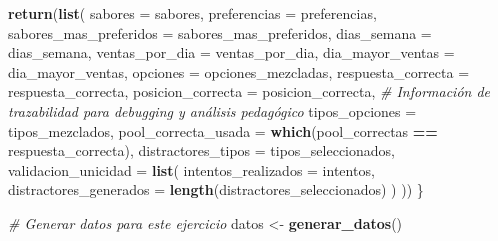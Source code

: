 \documentclass[
]{article}
\newenvironment{Shaded}{\begin{snugshade}}{\end{snugshade}}
\newcommand{\AttributeTok}[1]{\textcolor[rgb]{0.13,0.29,0.53}{#1}}
\newcommand{\CommentTok}[1]{\textcolor[rgb]{0.56,0.35,0.01}{\textit{#1}}}
\newcommand{\FunctionTok}[1]{\textcolor[rgb]{0.13,0.29,0.53}{\textbf{#1}}}
\newcommand{\NormalTok}[1]{#1}
\newcommand{\OtherTok}[1]{\textcolor[rgb]{0.56,0.35,0.01}{#1}}
\newcommand{\SpecialCharTok}[1]{\textcolor[rgb]{0.81,0.36,0.00}{\textbf{#1}}}
\begin{document}
\begin{Shaded}
\begin{Highlighting}[]
  \FunctionTok{return}\NormalTok{(}\FunctionTok{list}\NormalTok{(}
    \AttributeTok{sabores =}\NormalTok{ sabores,}
    \AttributeTok{preferencias =}\NormalTok{ preferencias,}
    \AttributeTok{sabores\_mas\_preferidos =}\NormalTok{ sabores\_mas\_preferidos,}
    \AttributeTok{dias\_semana =}\NormalTok{ dias\_semana,}
    \AttributeTok{ventas\_por\_dia =}\NormalTok{ ventas\_por\_dia,}
    \AttributeTok{dia\_mayor\_ventas =}\NormalTok{ dia\_mayor\_ventas,}
    \AttributeTok{opciones =}\NormalTok{ opciones\_mezcladas,}
    \AttributeTok{respuesta\_correcta =}\NormalTok{ respuesta\_correcta,}
    \AttributeTok{posicion\_correcta =}\NormalTok{ posicion\_correcta,}
    \CommentTok{\# Información de trazabilidad para debugging y análisis pedagógico}
    \AttributeTok{tipos\_opciones =}\NormalTok{ tipos\_mezclados,}
    \AttributeTok{pool\_correcta\_usada =} \FunctionTok{which}\NormalTok{(pool\_correctas }\SpecialCharTok{==}\NormalTok{ respuesta\_correcta),}
    \AttributeTok{distractores\_tipos =}\NormalTok{ tipos\_seleccionados,}
    \AttributeTok{validacion\_unicidad =} \FunctionTok{list}\NormalTok{(}
      \AttributeTok{intentos\_realizados =}\NormalTok{ intentos,}
      \AttributeTok{distractores\_generados =} \FunctionTok{length}\NormalTok{(distractores\_seleccionados)}
\NormalTok{    )}
\NormalTok{  ))}
\NormalTok{\}}

\CommentTok{\# Generar datos para este ejercicio}
\NormalTok{datos }\OtherTok{\textless{}{-}} \FunctionTok{generar\_datos}\NormalTok{()}
\end{Highlighting}
\end{Shaded}
\end{document}

